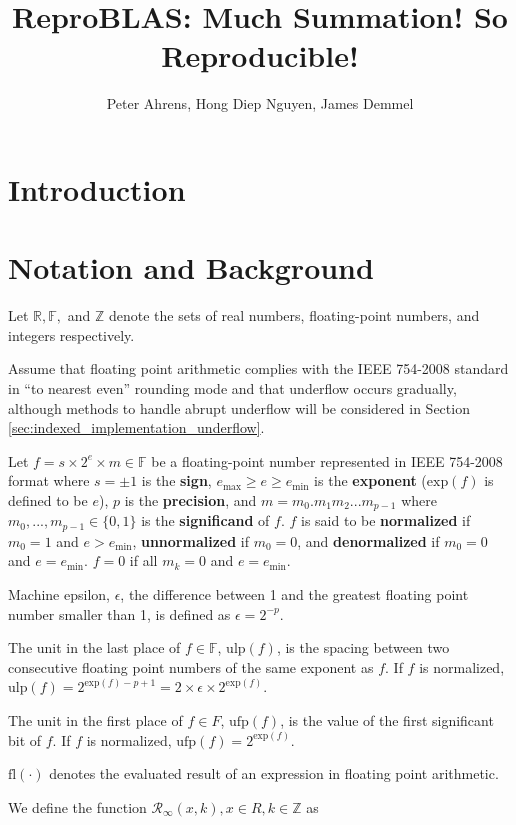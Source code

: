 \documentclass[12pt]{article}
\author{Peter Ahrens, Hong Diep Nguyen, James Demmel}
\title{ReproBLAS: Much Summation! So Reproducible!}
\providecommand{\R}{\ensuremath{\mathbb{R}}}
\providecommand{\F}{\ensuremath{\mathbb{F}}}
\providecommand{\Z}{\ensuremath{\mathbb{Z}}}
\providecommand{\exp}{\ensuremath{\text{exp}}}
\providecommand{\min}{\ensuremath{\text{min}}}
\providecommand{\max}{\ensuremath{\text{max}}}
\providecommand{\ulp}{\ensuremath{\text{ulp}}}
\providecommand{\ufp}{\ensuremath{\text{ufp}}}
\providecommand{\fl}{\ensuremath{\text{fl}}}
\providecommand{\roundtonearestinfty}{\ensuremath{\mathcal{R}_\text{$\infty$}}}
\theoremstyle{plain}
\numberwithin{equation}{section}
\begin{document}
\noindent
\maketitle
\tableofcontents
\newpage
\section{Introduction}
\section{Notation and Background}
  Let $\R, \F, $ and $\Z$ denote the sets of real numbers, floating-point numbers, and integers respectively.

  Assume that floating point arithmetic complies with the IEEE 754-2008 standard \cite{ieee754} in ``to nearest even'' rounding mode and that underflow occurs gradually, although methods to handle abrupt underflow will be considered in Section \ref{sec:indexed_implementation_underflow}.

  Let $f = s \times 2^e \times m \in \F$ be a floating-point number represented in IEEE 754-2008 format \cite{ieee754} where $s = \pm 1$ is the \textbf{sign}, $e_{\max} \geq e \geq e_{\min}$ is the \textbf{exponent} ($\exp(f)$ is defined to be $e$), $p$ is the \textbf{precision}, and $m = m_0.m_1m_2...m_{p-1}$ where $m_0, ..., m_{p - 1} \in \{0, 1\}$ is the \textbf{significand} of $f$. $f$ is said to be \textbf{normalized} if $m_0 = 1$ and $e > e_{\min}$, \textbf{unnormalized} if $m_0 = 0$, and \textbf{denormalized} if $m_0 = 0$ and $e = e_{\min}$. $f = 0$ if all $m_k = 0$ and $e = e_{\min}$.

  Machine epsilon, $\epsilon$, the difference between 1 and the greatest floating point number smaller than 1, is defined as $\epsilon = 2^{-p}$.

  The unit in the last place of $f \in \F$, $\ulp(f)$, is the spacing between two consecutive floating point numbers of the same exponent as $f$. If $f$ is normalized, $\ulp(f) = 2^{\exp(f) - p + 1} = 2 \times \epsilon \times 2^{\exp(f)}$.

  The unit in the first place of $f \in F$, $\ufp(f)$, is the value of the first significant bit of $f$. If $f$ is normalized, $\ufp(f) = 2^{\exp(f)}$.

  $\fl(\cdot)$ denotes the evaluated result of an expression in floating point arithmetic.

  We define the function $\roundtonearestinfty(x, k), x \in R, k \in \Z$ as
\end{document}

